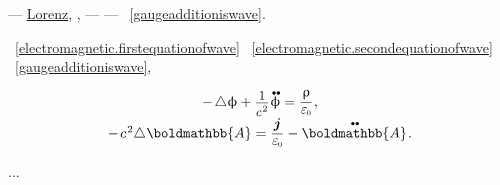 \vspace{-0.2em} \noindent --- \href{https://en.wikipedia.org/wiki/Lorenz_gauge_condition}{Lorenz},    , \:--- \href{https://en.wikipedia.org/wiki/Harmonic_function}{}\:--- ~\eqref{gaugeadditioniswave}.

~\eqref{electromagnetic.firstequationofwave} ~\eqref{electromagnetic.secondequationofwave} ~\eqref{gaugeadditioniswave},   

\nopagebreak\begin{equation}
\begin{array}{c}
- \hspace{-0.1ex} \Laplacian \upphi + \scalebox{0.9}{$\displaystyle \frac{\raisemath{-0.16em}{1}}{\raisemath{-0.1em}{c^{\hspace{.16ex}2}}}$} \hspace{.12ex} \mathdotdotabove{\upphi} = \smash{\displaystyle \frac{\uprho}{\raisemath{.16em}{\vacuumpermittivity}}}
\hspace{.1ex} ,
\\[.5em]
- \hspace{.25ex} c^{\hspace{.16ex}2} \hspace{-0.4ex} \Laplacian \hspace{.05ex} \boldmathbb{A} = \displaystyle \frac{\bm{j}}{\raisemath{.16em}{\vacuumpermittivity}} - \mathdotdotabove{\boldmathbb{A}}
\hspace{.2ex} .
\end{array}
\end{equation}

...





